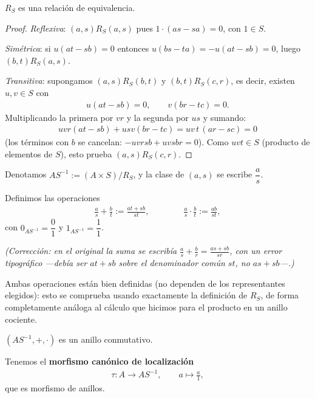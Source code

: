 \begin{prop}
$R_S$ es una relación de equivalencia.
\end{prop}
\begin{proof}
\emph{Reflexiva}: $(a,s)R_S(a,s)$ pues $1\cdot(as-sa)=0$, con $1\in S$.

\emph{Simétrica}: si $u(at-sb)=0$ entonces $u(bs-ta)=-u(at-sb)=0$, luego $(b,t)R_S(a,s)$.

\emph{Transitiva}: supongamos $(a,s)R_S(b,t)$ y $(b,t)R_S(c,r)$, es decir, existen $u,v\in S$ con
\begin{gather*}
    u(at-sb)=0, \qquad v(br-tc)=0.
\end{gather*}
Multiplicando la primera por $vr$ y la segunda por $us$ y sumando:
\begin{gather*}
    uvr(at-sb) + usv(br-tc) = uv\,t\,(ar-sc) = 0
\end{gather*}
(los términos con $b$ se cancelan: $-uvrsb+uvsbr=0$). Como $uvt\in S$ (producto de elementos de $S$), esto prueba $(a,s)R_S(c,r)$.
\end{proof}

Denotamos $AS^{-1} := (A\times S)/R_S$, y la clase de $(a,s)$ se escribe $\dfrac{a}{s}$.

Definimos las operaciones
\begin{gather*}
    \frac{a}{s} + \frac{b}{t} := \frac{at+sb}{st}, \qquad\qquad \frac{a}{s} \cdot \frac{b}{t} := \frac{ab}{st},
\end{gather*}
con $0_{AS^{-1}} = \dfrac{0}{1}$ y $1_{AS^{-1}} = \dfrac{1}{1}$.

\emph{(Corrección: en el original la suma se escribía $\frac{a}{s}+\frac{b}{r}=\frac{as+sb}{sr}$, con un error tipográfico —debía ser $at+sb$ sobre el denominador común $st$, no $as+sb$—.)}

Ambas operaciones están bien definidas (no dependen de los representantes elegidos): esto se comprueba usando exactamente la definición de $R_S$, de forma completamente análoga al cálculo que hicimos para el producto en un anillo cociente.

\begin{prop}
$(AS^{-1}, +, \cdot)$ es un anillo conmutativo.
\end{prop}

Tenemos el \textbf{morfismo canónico de localización}
\begin{gather*}
    \tau: A \to AS^{-1}, \qquad a \mapsto \frac{a}{1},
\end{gather*}
que es morfismo de anillos.

